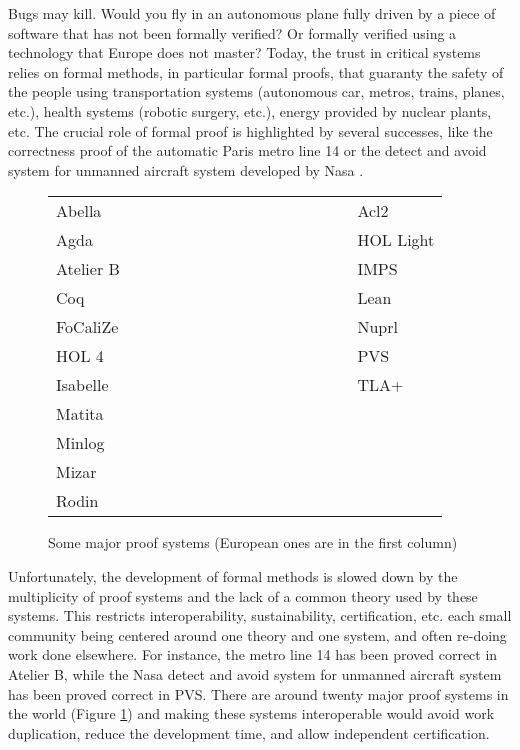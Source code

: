 Bugs may kill. Would you fly in an autonomous plane fully driven by a
piece of software that has not been formally verified?  Or formally
verified using a technology that Europe does not master? Today, the
trust in critical systems relies on formal methods, in particular
formal proofs, that guaranty the safety of the people using
transportation systems (autonomous car, metros, trains, planes, etc.),
health systems (robotic surgery, etc.), energy provided by nuclear
plants, etc. The crucial role of formal proof is highlighted by
several successes, like the correctness proof of the automatic Paris
metro line 14 \cite{metro14} or the detect and avoid system for
unmanned aircraft system developed by Nasa \cite{Munoz16}.

\thispagestyle{empty}

\begin{figure}
\begin{tabular}{ll}
{\sc Abella}~~~~~~~~~~~~~~~~~~~~~~~~~~~~~~&{\sc Acl2}\\
{\sc Agda}  &  {\sc HOL Light}\\
{\sc Atelier B}  &  {\sc IMPS}\\
{\sc Coq}  &  {\sc Lean}\\
{\sc FoCaliZe}  &  {\sc Nuprl}\\
{\sc HOL 4}  &  {\sc PVS}\\
{\sc Isabelle}  &  {\sc TLA+}\\
{\sc Matita}\\
{\sc Minlog}\\
{\sc Mizar}\\
{\sc Rodin}\\
\end{tabular}
\caption{Some major proof systems (European ones are in the first column) \label{systems}}
\end{figure}

Unfortunately, the development of formal methods is slowed down by the
multiplicity of proof systems and the lack of a common theory used by
these systems. This restricts interoperability, sustainability,
certification, etc.  each small community being centered around one
theory and one system, and often re-doing work done elsewhere.  For
instance, the metro line 14 has been proved correct in {\sc Atelier
B}, while the Nasa detect and avoid system for unmanned aircraft
system has been proved correct in {\sc PVS}.  There are around twenty
major proof systems in the world (Figure \ref{systems}) and making
these systems interoperable would avoid work duplication, reduce the
development time, and allow independent certification.

